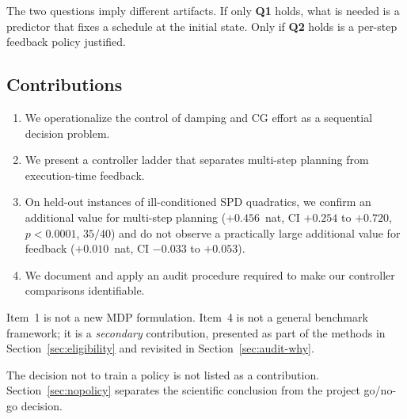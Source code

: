 The two questions imply different artifacts. If only \textbf{Q1} holds, what is
needed is a predictor that fixes a schedule at the initial state. Only if
\textbf{Q2} holds is a per-step feedback policy justified.

\subsection*{Contributions}

\begin{enumerate}
  \item We operationalize the control of damping and CG effort as a sequential
        decision problem.
  \item We present a controller ladder that separates multi-step planning from
        execution-time feedback.
  \item On held-out instances of ill-conditioned SPD quadratics, we confirm an
        additional value for multi-step planning ($+0.456$~nat, CI $+0.254$ to
        $+0.720$, $p < 0.0001$, $35/40$) and do not observe a practically large
        additional value for feedback ($+0.010$~nat, CI $-0.033$ to $+0.053$).
  \item We document and apply an audit procedure required to make our controller
        comparisons identifiable.
\end{enumerate}

Item~1 is not a new MDP formulation. Item~4 is not a general benchmark
framework; it is a \emph{secondary} contribution, presented as part of the
methods in Section~\ref{sec:eligibility} and revisited in
Section~\ref{sec:audit-why}.

The decision not to train a policy is not listed as a contribution.
Section~\ref{sec:nopolicy} separates the scientific conclusion from the project
go/no-go decision.
